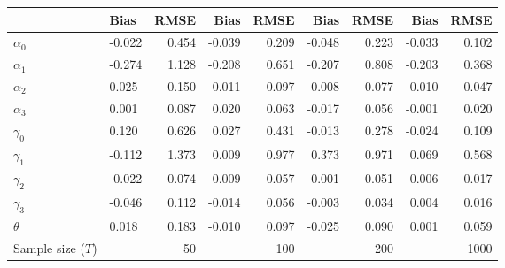 
\begin{tabular}[t]{llrrrrrrr}
\toprule
  & Bias & RMSE & Bias & RMSE & Bias & RMSE & Bias & RMSE\\
\midrule
$\alpha_{0}$ & -0.022 & 0.454 & -0.039 & 0.209 & -0.048 & 0.223 & -0.033 & 0.102\\
$\alpha_{1}$ & -0.274 & 1.128 & -0.208 & 0.651 & -0.207 & 0.808 & -0.203 & 0.368\\
$\alpha_{2}$ & 0.025 & 0.150 & 0.011 & 0.097 & 0.008 & 0.077 & 0.010 & 0.047\\
$\alpha_{3}$ & 0.001 & 0.087 & 0.020 & 0.063 & -0.017 & 0.056 & -0.001 & 0.020\\
$\gamma_{0}$ & 0.120 & 0.626 & 0.027 & 0.431 & -0.013 & 0.278 & -0.024 & 0.109\\
$\gamma_{1}$ & -0.112 & 1.373 & 0.009 & 0.977 & 0.373 & 0.971 & 0.069 & 0.568\\
$\gamma_{2}$ & -0.022 & 0.074 & 0.009 & 0.057 & 0.001 & 0.051 & 0.006 & 0.017\\
$\gamma_{3}$ & -0.046 & 0.112 & -0.014 & 0.056 & -0.003 & 0.034 & 0.004 & 0.016\\
$\theta$ & 0.018 & 0.183 & -0.010 & 0.097 & -0.025 & 0.090 & 0.001 & 0.059\\
Sample size ($T$) &  & 50 &  & 100 &  & 200 &  & 1000\\
\bottomrule
\end{tabular}
